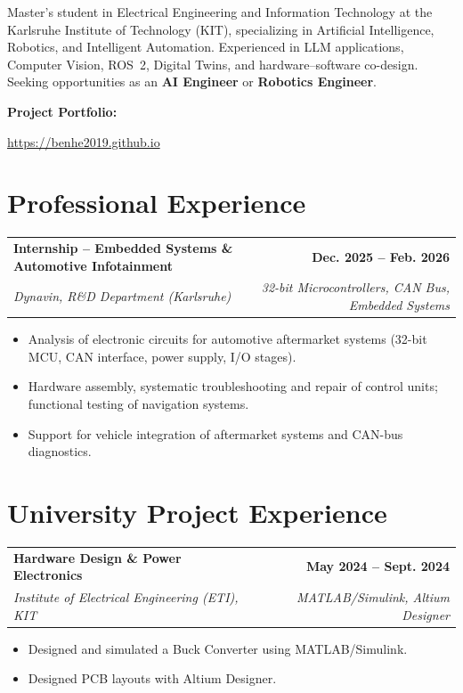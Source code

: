 \documentclass[a4paper,11pt]{article}
\makeatletter
\newcommand{\resumeEntry}[5]{
\vspace{1.5mm}
\noindent
\begin{tabular*}{\textwidth}{@{\extracolsep{\fill}}lr}
\textbf{#1} & \textbf{\color{darkblue}#4} \\
\textit{#3} & \textit{\small #5} \\
\end{tabular*}
\par
\ifstrempty{#2}{}{%
\vspace{0.4mm}
\noindent
{\small \faGithub\ \href{https://#2}{#2}}
\par
}
}
\makeatother
\begin{document}
Master's student in Electrical Engineering and Information Technology at the Karlsruhe Institute of Technology (KIT), specializing in Artificial Intelligence, Robotics, and Intelligent Automation. Experienced in LLM applications, Computer Vision, ROS~2, Digital Twins, and hardware--software co-design. Seeking opportunities as an \textbf{AI Engineer} or \textbf{Robotics Engineer}.

\vspace{2mm}

\textbf{Project Portfolio:}

\href{https://benhe2019.github.io}{https://benhe2019.github.io}


\section{Professional Experience}

\resumeEntry
{Internship -- Embedded Systems \& Automotive Infotainment}
{}
{Dynavin, R\&D Department (Karlsruhe)}
{Dec. 2025 -- Feb. 2026}
{32-bit Microcontrollers, CAN Bus, Embedded Systems}

\begin{itemize}
\item Analysis of electronic circuits for automotive aftermarket systems (32-bit MCU, CAN interface, power supply, I/O stages).
\item Hardware assembly, systematic troubleshooting and repair of control units; functional testing of navigation systems.
\item Support for vehicle integration of aftermarket systems and CAN-bus diagnostics.
\end{itemize}


\section{University Project Experience}

\resumeEntry
{Hardware Design \& Power Electronics}
{}
{Institute of Electrical Engineering (ETI), KIT}
{May 2024 -- Sept. 2024}
{MATLAB/Simulink, Altium Designer}

\begin{itemize}
\item Designed and simulated a Buck Converter using MATLAB/Simulink.
\item Designed PCB layouts with Altium Designer.
\end{itemize}
\end{document}
